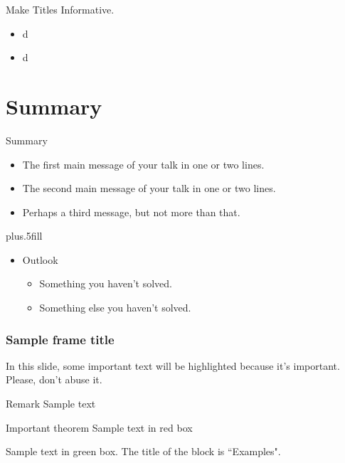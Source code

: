 \documentclass{beamer}
\begin{document}
\begin{frame}{Make Titles Informative.}
    \begin{itemize}
    \item
       d
    \item
        d
    \end{itemize}
\end{frame}



\section*{Summary}

\begin{frame}{Summary}
  \begin{itemize}
  \item
    The \alert{first main message} of your talk in one or two lines.
  \item
    The \alert{second main message} of your talk in one or two lines.
  \item
    Perhaps a \alert{third message}, but not more than that.
  \end{itemize}
  \vskip0pt plus.5fill
  \begin{itemize}
  \item
    Outlook
    \begin{itemize}
    \item
      Something you haven't solved.
    \item
      Something else you haven't solved.
    \end{itemize}
  \end{itemize}
\end{frame}

\begin{frame}
\frametitle{Sample frame title}

In this slide, some important text will be
\alert{highlighted} because it's important.
Please, don't abuse it.

\begin{block}{Remark}
Sample text
\end{block}

\begin{alertblock}{Important theorem}
Sample text in red box
\end{alertblock}

\begin{examples}
Sample text in green box. The title of the block is ``Examples".
\end{examples}
\end{frame}
\end{document}

